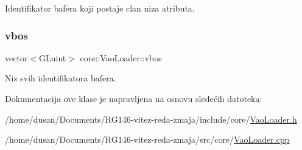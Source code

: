 Identifikator bafera koji postaje clan niza atributa. 

\mbox{\label{classcore_1_1VaoLoader_a8866245dbda8794e13956115557159a2}} 
\subsubsection{\texorpdfstring{vbos}{vbos}}
{\footnotesize\ttfamily vector$<$G\+Luint$>$ core\+::\+Vao\+Loader\+::vbos\hspace{0.3cm}{\ttfamily [private]}}



Niz svih identifikatora bafera. 



Dokumentacija ove klase je napravljena na osnovu sledećih datoteka\+:\begin{DoxyCompactItemize}
\item 
/home/dusan/\+Documents/\+R\+G146-\/vitez-\/reda-\/zmaja/include/core/\hyperlink{VaoLoader_8h}{Vao\+Loader.\+h}\item 
/home/dusan/\+Documents/\+R\+G146-\/vitez-\/reda-\/zmaja/src/core/\hyperlink{VaoLoader_8cpp}{Vao\+Loader.\+cpp}\end{DoxyCompactItemize}

